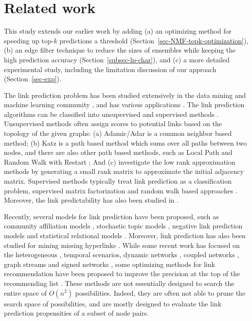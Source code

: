 \section{Related work}
\label{sec-related}

This study extends our earlier work \cite{liang2016} by adding
(a) an optimizing method for speeding up top-$k$ predictions \wrt a threshold (Section~\ref{sec-NMF-topk-optimization}), (b) an edge filter technique to reduce the sizes of ensembles while keeping the high prediction accuracy (Section~\ref{subsec-lp-char}), and (c) a more detailed experimental study, including the limitation discussion of our approach (Section~\ref{sec-exp}).




The link prediction problem has been studied extensively in the data mining and machine learning community
\cite{kleinberg,linyuan-2011}, and has various applications  \cite{adom,kunegis,kleinberg,barbieri2014,back,tang2015,lv2012}.
The link prediction algorithms can be classified into unsupervised and supervised methods \cite{propflow}. Unsupervised methods
often assign scores to potential links based on the topology of the given graphs:
(a) Adamic/Adar \cite{adamic} is a common neighbor based method; (b) Katz \cite{katz-1953} is a
path based method which sums over all paths between two nodes, and there are also other path based
methods, such as Local Path and Random Walk with Restart \cite{linyuan-2011}; And (c)
\cite{kunegis,kleinberg} investigate the low rank approximation methods by generating a
small rank matrix to approximate the initial adjacency matrix. Supervised methods
\cite{propflow,chen2015} typically treat link prediction as a classification problem, \eg supervised matrix factorization and random walk based approaches \cite{menon,back}. Moreover, the link predictability has also been studied in \cite{lv2015}.

Recently, several models for link prediction have been proposed,
such as  community affiliation models \cite{yang-wsdm2013}, stochastic topic models \cite{barbieri2014},
negative link prediction models \cite{tang2015} and statistical relational models \cite{Getoor02}.
Moreover, link prediction has also been studied for mining
missing hyperlinks \cite{west2015}.
While some recent work has focused on the heterogeneous \cite{yang}, temporal \cite{dwang} scenarios, dynamic networks \cite{zhu2016}, coupled networks \cite{dong2015},
graph streams \cite{zhao2016} and signed networks \cite{song2015kdd}, some optimizing methods for link recommendation have been proposed to improve the precision at the top of the recommending list \cite{song2015}.
These methods are not essentially
designed to search the entire space of $O(n^2)$ possibilities. Indeed, they are often not able to prune the search space of possibilities, and are mostly designed to evaluate the link prediction propensities of a subset of node pairs.




